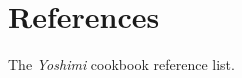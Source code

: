 %
%
%

\section{References}
\label{sec:cookbook_references}

   The \textsl{Yoshimi} cookbook reference list.

